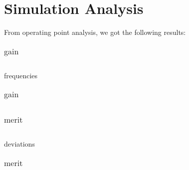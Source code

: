 \section{Simulation Analysis}
\label{sec:simulation} 

From operating point analysis, we got the following results:
%    



%    



\FloatBarrier  
\begin{table}[!htb]

\parbox{.45\linewidth}{
\centering
\begin{tabular}{|l|l|}
    \hline
    

  \end{tabular}
  \caption{frequencies}
}

\hfill
\parbox{.45\linewidth}{
\centering
\begin{tabular}{|l|l|}
    \hline    
    

  \end{tabular}
  \caption{gain}
}

\end{table}
\FloatBarrier  


\FloatBarrier  
\begin{table}[!htb]
\parbox{.45\linewidth}{
\centering
\begin{tabular}{|l|l|}
    \hline    
    
  \end{tabular}
  \caption{deviations}
}

\hfill
\parbox{.45\linewidth}{
\centering
\begin{tabular}{|l|l|}
    \hline    
    
  \end{tabular}
  \caption{merit}
  \label{tab:Spice1}
}
\end{table}
\FloatBarrier  



